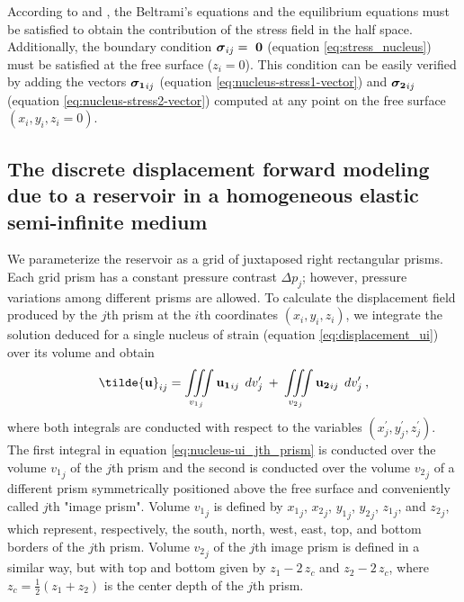 \documentclass[journal abbreviation, manuscript]{copernicus}
\begin{document}
According to \cite{Sharma56} and \cite{Tempone10}, the Beltrami’s equations \citep{Beltrami} and the equilibrium equations must be satisfied to obtain the contribution of the stress field in the half space. 
Additionally, the boundary condition 
$\mbox{\boldmath$\sigma$}_{ij} = \mbox{ \boldmath$0$}$ (equation \ref{eq:stress_nucleus})
must be satisfied at the free surface ($z_i = 0$).
This condition can be easily verified by adding the vectors 
$\mbox{\boldmath$\sigma_{1}$}_{ij}$ (equation \ref{eq:nucleus-stress1-vector}) and 
$\mbox{\boldmath$\sigma_{2}$}_{ij}$ (equation \ref{eq:nucleus-stress2-vector}) 
computed at any point on the free surface $(x_i, y_i, z_i = 0)$.


\subsection{The discrete displacement forward modeling due to a reservoir in a homogeneous elastic semi-infinite medium} \label{u-model}


We parameterize the reservoir as a grid of juxtaposed right rectangular prisms.
Each grid prism has a constant pressure contrast $\Delta p_{j}$; however, pressure variations among different prisms are allowed. 
To calculate the displacement field produced by the $j$th prism
at the $i$th coordinates  $(x_i, y_i, z_i)$, we integrate the solution deduced for a single nucleus of strain (equation \ref{eq:displacement_ui})
over its volume and obtain
\begin{equation}
{\bf{\tilde{u}}}_{ij} = 
\iiint\limits_{{v_{1}}_{j}}
{\bf{u_{1}}}_{ij} \: \:  dv_{j}^{\prime}
\: + \:
\iiint\limits_{{v_{2}}_{j}}
{\bf{u_{2}}}_{ij} \:\:  dv_{j}^{\prime} \: ,
\label{eq:nucleus-ui_jth_prism}
\end{equation}
where both integrals are conducted with respect to the variables 
$(x^{\prime}_{j}, y^{\prime}_{j}, z^{\prime}_{j})$. The first integral in equation 
\ref{eq:nucleus-ui_jth_prism} is conducted over the volume ${v_{1}}_{j}$ of the $j$th
prism and the second is conducted over the volume 
${v_{2}}_{j}$ of a different prism symmetrically positioned above the free surface 
and conveniently called $j$th "image prism".
Volume ${v_{1}}_{j}$ is defined by ${x_1}_{j}$, ${x_2}_{j}$, ${y_1}_{j}$, ${y_2}_{j}$,
${z_1}_{j}$, and ${z_2}_{j}$, which represent, respectively, the south, north, west, 
east, top, and bottom borders of the $j$th prism.
Volume ${v_{2}}_{j}$ of the $j$th image prism is defined in a similar way, but with 
top and bottom given by $z_1 - 2 \, z_c$ and $z_2 - 2 \, z_c$, where 
$z_c = \frac{1}{2}(z_1 + z_2)$ is the center depth of the $j$th prism.
\end{document}
